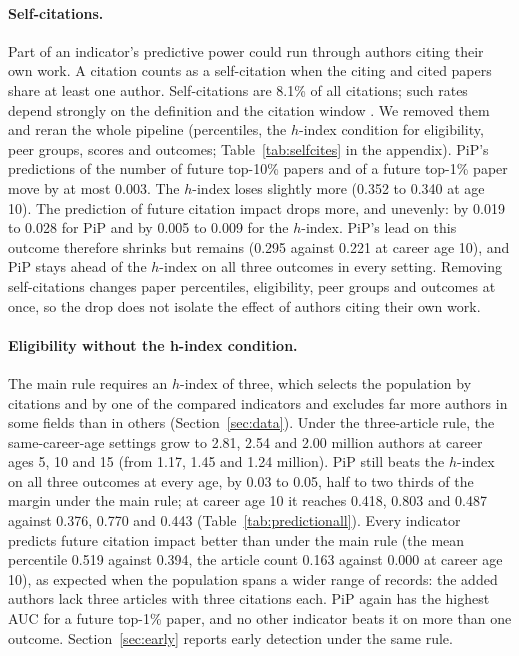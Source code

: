 \documentclass[11pt]{article}
\begin{document}
\paragraph{Self-citations.} Part of an indicator's predictive power could run through authors citing their own work. A
citation counts as a self-citation when the citing and cited papers share at least one author. Self-citations are
8.1\% of all citations; such rates depend strongly on the definition and the citation window \citep{aksnes2003macro}.
We removed them and reran the whole pipeline (percentiles, the $h$-index condition for eligibility, peer groups,
scores and outcomes; Table~\ref{tab:selfcites} in the appendix). PiP's predictions of the number of future top-10\%
papers and of a future top-1\% paper move by at most 0.003. The $h$-index loses slightly more (0.352 to 0.340 at age
10). The prediction of future citation impact drops more, and unevenly: by 0.019 to 0.028 for PiP and by 0.005 to
0.009 for the $h$-index. PiP's lead on this outcome therefore shrinks but remains (0.295 against 0.221 at career age
10), and PiP stays ahead of the $h$-index on all three outcomes in every setting. Removing self-citations changes
paper percentiles, eligibility, peer groups and outcomes at once, so the drop does not isolate the effect of authors
citing their own work.

\paragraph{Eligibility without the h-index condition.} The main rule requires an $h$-index of three, which selects the
population by citations and by one of the compared indicators and excludes far more authors in some fields than in
others (Section~\ref{sec:data}). Under the three-article rule, the same-career-age settings grow to 2.81, 2.54 and
2.00 million authors at career ages 5, 10 and 15 (from 1.17, 1.45 and 1.24 million). PiP still beats the $h$-index on
all three outcomes at every age, by 0.03 to 0.05, half to two thirds of the margin under the main rule; at career age
10 it reaches 0.418, 0.803 and 0.487 against 0.376, 0.770 and 0.443 (Table~\ref{tab:predictionall}). Every indicator
predicts future citation impact better than under the main rule (the mean percentile 0.519 against 0.394, the article
count 0.163 against 0.000 at career age 10), as expected when the population spans a wider range of records: the added
authors lack three articles with three citations each. PiP again has the highest AUC for a future top-1\% paper, and
no other indicator beats it on more than one outcome. Section~\ref{sec:early} reports early detection under the same
rule.
\end{document}
